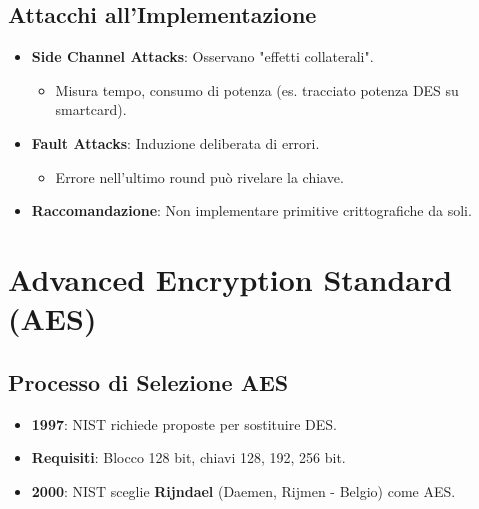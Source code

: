 \documentclass{article}
\begin{document}
\subsection{Attacchi all'Implementazione}
\begin{itemize}
    \item \textbf{Side Channel Attacks}: Osservano "effetti collaterali".
    \begin{itemize}
        \item Misura tempo, consumo di potenza (es. tracciato potenza DES su smartcard).
    \end{itemize}
    \item \textbf{Fault Attacks}: Induzione deliberata di errori.
    \begin{itemize}
        \item Errore nell'ultimo round può rivelare la chiave.
    \end{itemize}
    \item \textbf{Raccomandazione}: Non implementare primitive crittografiche da soli.
\end{itemize}

\section{Advanced Encryption Standard (AES)}

\subsection{Processo di Selezione AES}
\begin{itemize}
    \item \textbf{1997}: NIST richiede proposte per sostituire DES.
    \item \textbf{Requisiti}: Blocco 128 bit, chiavi 128, 192, 256 bit.
    \item \textbf{2000}: NIST sceglie \textbf{Rijndael} (Daemen, Rijmen - Belgio) come AES.
\end{itemize}
\end{document}
